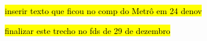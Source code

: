 \hl{inserir texto que ficou no comp do Metrô em 24 denov}

\hl{finalizar este trecho no fds de 29 de dezembro}








